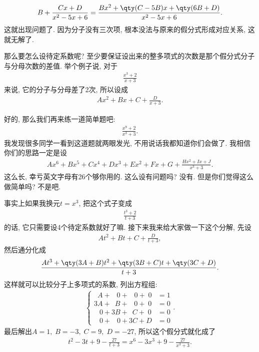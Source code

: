 \documentclass{ctexbook}
\begin{document}
{\begin{align*}
B+\frac{Cx+D}{x^{2}-5x+6}=\frac{Bx^{2}+\qty(C-5B)x+\qty(6B+D)}{x^{2}-5x+6}
.\end{align*}
这就出现问题了. 因为分子没有三次项, 根本没法与原来的假分式形成对应关系, 这就无解了. \par
那么要怎么设待定系数呢? 至少要保证设出来的整多项式的次数是那个假分式分子与分母次数的差值. 举个例子说, 对于
\begin{align*}
\frac{x^{3}+2}{x+3}
\end{align*}
来说, 它的分子与分母差了2次, 所以设成
\begin{align*}
Ax^{2}+Bx+C+\frac{D}{x+3}
.\end{align*}\par
好的, 那么我们再来练一道简单题吧: 
\begin{align*}
\frac{x^{9}+2}{x^{3}+3}
.\end{align*}
我发现很多同学一看到这道题就两眼发光, 不用说话我都知道你们会做了. 我相信你们的思路一定是设
\begin{align*}
Ax^{6}+Bx^{5}+Cx^{4}+Dx^{3}+Ex^{2}+Fx+G+\frac{Hx^{2}+Ix+J}{x^{3}+3}
.\end{align*}
这么长, 幸亏英文字母有26个够你用的. 这么设有问题吗? 没有. 但是你们觉得这么做简单吗? 不是吧. \par
事实上如果我换元$t=x^{3}$, 把这个式子变成
\begin{align*}
\frac{t^{3}+2}{t+3}
\end{align*}
的话, 它只需要设4个待定系数就好了嘛. 接下来我来给大家做一下这个分解, 先设
\begin{align*}
At^{2}+Bt+C+\frac{D}{t+3}
,\end{align*}
然后通分化成
\begin{align*}
\frac{At^{3}+\qty(3A+B)t^{2}+\qty(3B+C)t+\qty(3C+D)}{t+3}
.\end{align*}
这样就可以比较分子上多项式的系数, 列出方程组: 
\begin{align*}
\begin{cases}
\;\:A+\;\;\:0+\;\;\:0+\;0&=1\\
3A+\;\:B+\;\;\:0+\;0&=0\\
\;\;\:0+3B+\;\:C+\;0&=0\\
\;\;\:0+\;\;\:0+3C+D&=0
\end{cases}
.\end{align*}
最后解出$A=1,\;B=-3,\;C=9,\;D=-27$, 所以这个假分式就化成了
\begin{align*}
t^{2}-3t+9-\frac{27}{t+3}=x^{6}-3x^{3}+9-\frac{27}{x^{3}+3}
.\end{align*}\par
}
\end{document}
